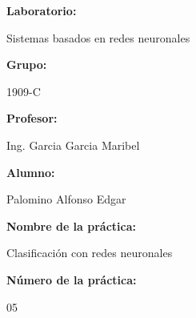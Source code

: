 \documentclass[a4paper]{article}
\begin{document}
    \begin{titlepage}
        \centering
        \par\vspace{0.5cm}

        \par\vspace{1cm}

        \raggedright{\huge\textbf{Laboratorio:}}
        \par\vspace{0.5cm}
        \centering
        {\huge{Sistemas basados en redes neuronales}}
        \par\vspace{0.5cm}

        \raggedright{\huge\textbf{Grupo:}}
        \par\vspace{0.5cm}
        \centering
        {\huge{1909-C}}
        \par\vspace{0.5cm}

        \raggedright{\huge\textbf{Profesor:}}
        \par\vspace{0.5cm}
        \centering
        {\huge{Ing. Garcia Garcia Maribel}}
        \par\vspace{0.5cm}

        \raggedright{\huge\textbf{Alumno:}}
        \par\vspace{0.5cm}
        \centering
        {\huge{Palomino Alfonso Edgar}}
        \par\vspace{0.5cm}

        \raggedright{\huge\textbf{Nombre de la práctica:}}
        \par\vspace{0.5cm}
        \centering
        {\huge{Clasificación con redes neuronales}}
        \par\vspace{0.5cm}

        \raggedright{\huge\textbf{Número de la práctica:}}
        \par\vspace{0.5cm}
        \centering
        {\huge{05}}
        \par\vspace{0.5cm}


\end{titlepage}
\end{document}
